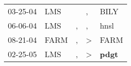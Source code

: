\begin{supertabular}{p{0.07\textwidth}p{0.06\textwidth}p{0.02\textwidth}p{0.02\textwidth}p{0.06\textwidth}}
 03-25-04\textsuperscript{} &   LMS\textsuperscript{} &    &             , &           BILY\textsuperscript{} \\
 06-06-04\textsuperscript{} &   LMS\textsuperscript{} &  , &             , &           hnsl\textsuperscript{} \\
 08-21-04\textsuperscript{} &  FARM\textsuperscript{} &  , &  \textgreater &           FARM\textsuperscript{} \\
 02-25-05\textsuperscript{} &   LMS\textsuperscript{} &  , &  \textgreater &  \textbf{pdgt\textsuperscript{}} \\
\end{supertabular}
